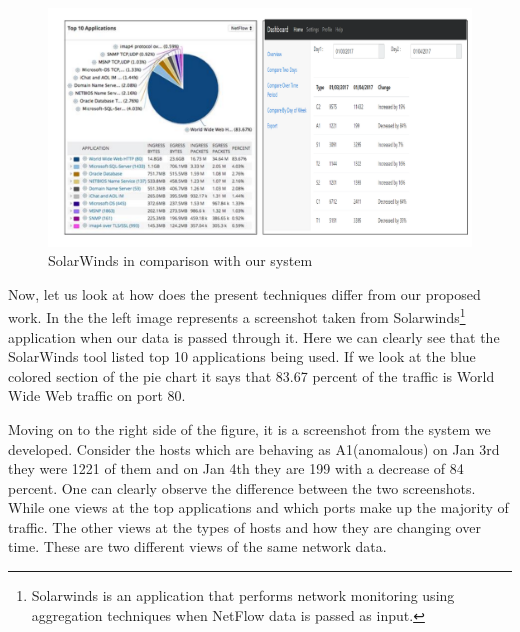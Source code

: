 \begin{figure}[b]
	\centerline{\includegraphics[scale = 0.5]{intro.pdf}}
	\caption{SolarWinds in comparison with our system}%
\end{figure}

Now, let us look at how does the present techniques differ from our proposed work. In the  the left image represents a screenshot taken from Solarwinds\footnote{Solarwinds is an application that performs network monitoring using aggregation techniques when NetFlow data is passed as input.} application when our data is passed through it. Here we can clearly see that the SolarWinds tool listed top 10 applications being used. If we look at the blue colored section of the pie chart it says that 83.67 percent of the traffic is World Wide Web traffic on port 80. 

Moving on to the right side of the figure, it is a screenshot from the system we developed. Consider the hosts which are behaving as A1(anomalous) on Jan 3rd they were 1221 of them and on Jan 4th they are 199 with a decrease of 84 percent. One can clearly observe the difference between the two screenshots. While one views at the top applications and which ports make up the majority of traffic. The other views at the types of hosts and how they are changing over time. These are two different views of the same network data.


